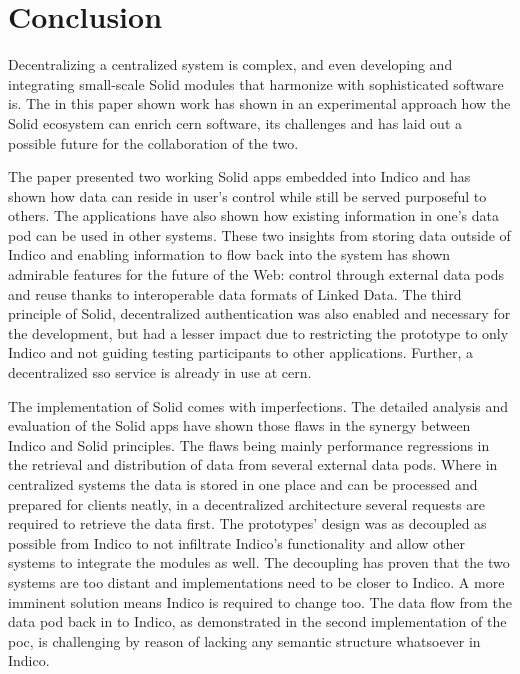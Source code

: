 \chapter{Conclusion}

Decentralizing a centralized system is complex, and even developing and integrating small-scale Solid modules that harmonize with sophisticated software is. The in this paper shown work has shown in an experimental approach how the Solid ecosystem can enrich \gls{cern} software, its challenges and has laid out a possible future for the collaboration of the two.

The paper presented two working Solid apps embedded into Indico and has shown how data can reside in user's control while still be served purposeful to others. The applications have also shown how existing information in one's data pod can be used in other systems. These two insights from storing data outside of Indico and enabling information to flow back into the system has shown admirable features for the future of the Web: control through external data pods and reuse thanks to interoperable data formats of Linked Data. The third principle of Solid, decentralized authentication was also enabled and necessary for the development, but had a lesser impact due to restricting the prototype to only Indico and not guiding testing participants to other applications. Further, a decentralized \gls{sso} service is already in use at \gls{cern}.

The implementation of Solid comes with imperfections. The detailed analysis and evaluation of the Solid apps have shown those flaws in the synergy between Indico and Solid principles. The flaws being mainly performance regressions in the retrieval and distribution of data from several external data pods. Where in centralized systems the data is stored in one place and can be processed and prepared for clients neatly, in a decentralized architecture several requests are required to retrieve the data first. The prototypes' design was as decoupled as possible from Indico to not infiltrate Indico's functionality and allow other systems to integrate the modules as well. The decoupling has proven that the two systems are too distant and implementations need to be closer to Indico. A more imminent solution means Indico is required to change too. The data flow from the data pod back in to Indico, as demonstrated in the second implementation of the \gls{poc}, is challenging by reason of lacking any semantic structure whatsoever in Indico.


